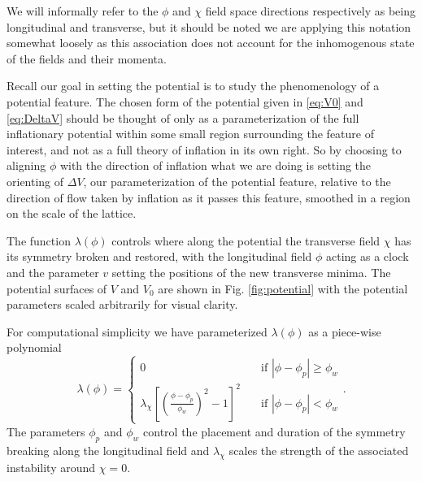 
We will informally refer to the $\phi$ and $\chi$ field space directions respectively as being longitudinal and transverse, but it should be noted we are applying this notation somewhat loosely as this association does not account for the inhomogenous state of the fields and their momenta.

Recall our goal in setting the potential is to study the phenomenology of a potential feature. The chosen form of the potential given in \eqref{eq:V0} and \eqref{eq:DeltaV} should be thought of only as a parameterization of the full inflationary potential within some small region surrounding the feature of interest, and not as a full theory of inflation in its own right. So by choosing to aligning $\phi$ with the direction of inflation what we are doing is setting the orienting of $\Delta V$, our parameterization of the potential feature, relative to the direction of flow taken by inflation as it passes this feature, smoothed in a region on the scale of the lattice.

The function $\lambda(\phi)$ controls where along the potential the transverse field $\chi$ has its symmetry broken and restored, with the longitudinal field $\phi$ acting as a clock and the parameter $v$ setting the positions of the new transverse minima. The potential surfaces of $V$ and $V_0$ are shown in Fig. \ref{fig:potential} with the potential parameters scaled arbitrarily for visual clarity.

For computational simplicity we have parameterized $\lambda(\phi)$ as a piece-wise polynomial
\begin{equation} \label{eq:lambda}
  \lambda(\phi) =
  \begin{cases}
    0 & \quad \text{if } |\phi-\phi_p|\ge\phi_w \\
    \lambda_\chi\left[\left(\frac{\phi-\phi_p}{\phi_w}\right)^2 - 1 \right]^2 & \quad \text{if  } |\phi-\phi_p|<\phi_w
  \end{cases}.
\end{equation}
The parameters $\phi_p$ and $\phi_w$ control the placement and duration of the symmetry breaking along the longitudinal field and $\lambda_\chi$ scales the strength of the associated instability around $\chi=0$.

